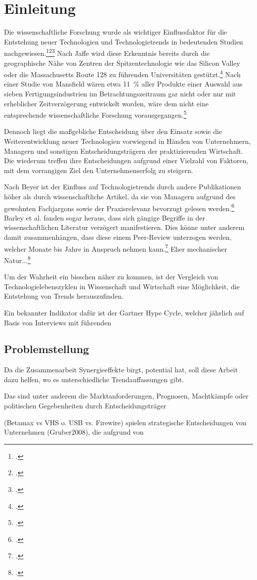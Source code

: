 \section{Einleitung}
Die wissenschaftliche Forschung wurde als wichtiger Einflussfaktor für die Entstehung neuer Technologien und Technologietrends in bedeutenden Studien nachgewiesen.\footcite[Vgl.][S.~11]{Mansfield1991}\footcite[Vgl.][S.~1652]{Gruber2008}\footcite[Vgl.][S.~599]{Tegarden2012} Nach Jaffe wird diese Erkenntnis bereits durch die geographische Nähe von Zentren der Spitzentechnologie wie das Silicon Valley oder die Massachusetts Route 128 zu führenden Universitäten gestützt.\footcite[Vgl.][S.~967f]{Jaffe1989} Nach einer Studie von Mansfield wären etwa 11~\% aller Produkte einer Auswahl aus sieben Fertigungsindustrien im Betrachtungszeitraum gar nicht oder nur mit erheblicher Zeitverzögerung entwickelt worden, wäre dem nicht eine entsprechende wissenschaftliche Forschung vorausgegangen.\footcite[Vgl.][S.~2]{Mansfield1991}

Dennoch liegt die maßgebliche Entscheidung über den Einsatz sowie die Weiterentwicklung neuer Technologien vorwiegend in Händen von Unternehmern, Managern und sonstigen Entscheidungsträgern der praktizierenden Wirtschaft. Die wiederum treffen ihre Entscheidungen aufgrund einer Vielzahl von Faktoren, mit dem vorrangigen Ziel den Unternehmenserfolg zu steigern. 

Nach Beyer ist der Einfluss auf Technologietrends durch andere Publikationen höher als durch wissenschaftliche Artikel, da sie von Managern aufgrund des gewohnten Fachjargons sowie der Praxisrelevanz bevorzugt gelesen werden.\footcite[Vgl.][S.]{Beyer1992} Barley et al. fanden sogar heraus, dass sich gängige Begriffe in der wissenschaftlichen Literatur verzögert manifestieren. Dies könne unter anderem damit zusammenhängen, dass diese einem Peer-Review unterzogen werden, welcher Monate bis Jahre in Anspruch nehmen kann.\footcite[Vgl.][S.]{Barley1988}
Eher mechanischer Natur...\footcite[Vgl.][S.345]{Spell1999}

Um der Wahrheit ein bisschen näher zu kommen, ist der Vergleich von Technologielebenszyklen in Wissenschaft und Wirtschaft eine Möglichkeit, die Entstehung von Trends herauszufinden.

Ein bekannter Indikator dafür ist der Gartner Hype Cycle, welcher jährlich auf Basis von Interviews mit führenden 


\subsection{Problemstellung}
Da die Zusammenarbeit Synergieeffekte birgt, potential hat, soll diese Arbeit dazu helfen, wo es unterschiedliche Trendauffassungen gibt.



Das sind unter anderem die Marktanforderungen, Prognosen, Machtkämpfe oder politischen Gegebenheiten durch Entscheidungsträger



(Betamax vs VHS o. USB vs. Firewire) spielen strategische Entscheidungen von Unternehmen (Gruber2008), die aufgrund von 